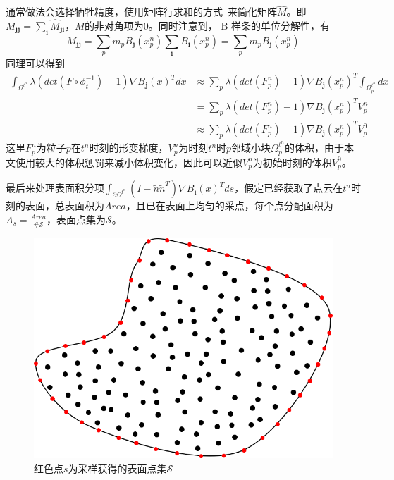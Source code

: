 通常做法会选择牺牲精度，使用矩阵行求和的方式~\cite{de2020material}来简化矩阵$\hat{M}$。即$M_{\mathbf{jj}} = \sum_{\mathbf{i}}\hat{M}_{\mathbf{ji}}$，$M$的非对角项为0。同时注意到，
B-样条的单位分解性，有
$$M_{\mathbf{jj}} = \sum_p m_p B_{\mathbf{j}}(x_p^n)\sum_\mathbf{i}B_\mathbf{i}(x_p^n) = \sum_p m_p B_{\mathbf{j}}(x_p^n)$$
同理可以得到
\begin{align}
    \int_{\Omega^{t^n}}\lambda (det(F\circ \phi_t^{-1}) - 1)\nabla B_{\mathbf{j}}(x)^Tdx &\approx \sum_p \lambda (det(F_p^n) - 1)\nabla B_{\mathbf{j}}(x_p^n)^T\int_{\Omega^{t^n}_p}dx \nonumber\\
    & = \sum_p \lambda (det(F_p^n) - 1)\nabla B_{\mathbf{j}}(x_p^n)^T V_p^n\nonumber \\
    & \approx \sum_p \lambda (det(F_p^n) - 1)\nabla B_{\mathbf{j}}(x_p^n)^T V_p^0\nonumber     
\end{align}
这里$F_p^n$为粒子$p$在$t^n$时刻的形变梯度，$V_p^n$为时刻$t^n$时$p$邻域小块$\Omega_p^{t^n}$的体积，由于本文使用较大的体积惩罚来减小体积变化，因此可以近似$V_p^n$为初始时刻的体积$V_p^0$。

最后来处理表面积分项$\int_{\partial \Omega^{t^n}} (I - \tilde{n}\tilde{n}^T)\nabla B_{\mathbf{i}}(x)^T ds$，假定已经获取了点云在$t^n$时刻的表面，总表面积为$Area$，且已在表面上均匀的采点，每个点分配面积为$A_s = \frac{Area}{\#\mathcal{S}}$，表面点集为$\mathcal{S}$。
\begin{figure}[htbp]
    \centering
    \includegraphics[scale=0.4]{./images/image12.png}
    \caption{红色点$s$为采样获得的表面点集$\mathcal{S}$}
    \label{fig: surface of point cloud}
\end{figure}

